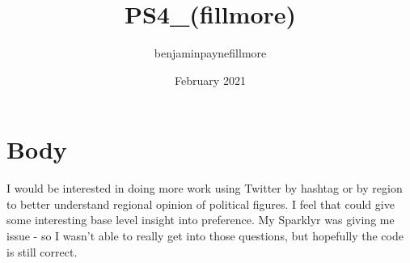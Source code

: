 \documentclass{article}
\title{PS4_(fillmore)}
\author{benjaminpaynefillmore }
\date{February 2021}
\begin{document}
\maketitle

\section{Body}
I would be interested in doing more work using Twitter by hashtag or by region to better understand regional opinion of political figures. I feel that could give some interesting base level insight into preference. My Sparklyr was giving me issue - so I wasn't able to really get into those questions, but hopefully the code is still correct. 
\end{document}
